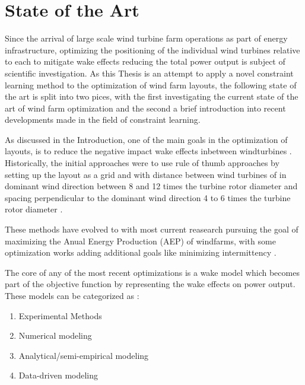 
\chapter{State of the Art}\label{chapter:state_of_the_art}

Since the arrival of large scale wind turbine farm operations as part of energy infrastructure, optimizing the positioning of the individual wind turbines relative to each to mitigate wake effects reducing the total power output is subject of scientific investigation. As this Thesis is an attempt to apply a novel constraint learning method to the optimization of wind farm layouts, the following state of the art is split into two pices, with the first investigating the current state of the art of wind farm optimization and the second a brief introduction into recent developments made in the field of constraint learning. 

As discussed in the Introduction, one of the main goals in the optimization of layouts, is to reduce the negative impact wake effects inbetween windturbines \cite{KIM2024123383}. Historically, the initial approaches were to use rule of thumb approaches by setting up the layout as a grid and with distance between wind turbines of in dominant wind direction  between 8 and 12 times the turbine rotor diameter and spacing perpendicular to the dominant wind direction 4 to 6 times the turbine rotor diameter \cite{AZLAN2021110047} \cite{hou_review_2019}.

These methods have evolved to with most current reasearch pursuing the goal of maximizing the Anual Energy Production (AEP) of windfarms, with some optimization works adding additional goals like minimizing intermittency \cite{KIM2024123383}. 

The core of any of the most recent optimizations is a wake model which becomes part of the objective function by representing the wake effects on power output. These models can be categorized as \cite{WANG2024118508}: 

\begin{enumerate}
	\item Experimental Methods
	\item Numerical modeling
	\item Analytical/semi-empirical modeling
	\item Data-driven modeling
\end{enumerate}

